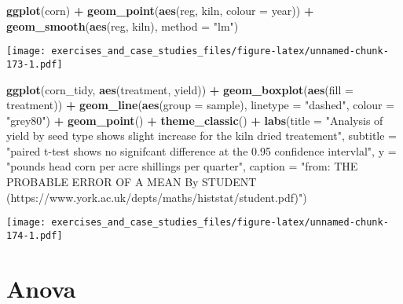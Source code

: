 \documentclass[]{book}
\newenvironment{Shaded}{\begin{snugshade}}{\end{snugshade}}
\newcommand{\DataTypeTok}[1]{\textcolor[rgb]{0.13,0.29,0.53}{#1}}
\newcommand{\KeywordTok}[1]{\textcolor[rgb]{0.13,0.29,0.53}{\textbf{#1}}}
\newcommand{\NormalTok}[1]{#1}
\newcommand{\OperatorTok}[1]{\textcolor[rgb]{0.81,0.36,0.00}{\textbf{#1}}}
\newcommand{\StringTok}[1]{\textcolor[rgb]{0.31,0.60,0.02}{#1}}
\theoremstyle{definition}
\theoremstyle{definition}
\theoremstyle{definition}
\theoremstyle{remark}
\begin{document}
\begin{Shaded}
\begin{Highlighting}[]
\KeywordTok{ggplot}\NormalTok{(corn) }\OperatorTok{+}
\StringTok{  }\KeywordTok{geom_point}\NormalTok{(}\KeywordTok{aes}\NormalTok{(reg, kiln, }\DataTypeTok{colour =}\NormalTok{ year)) }\OperatorTok{+}
\StringTok{  }\KeywordTok{geom_smooth}\NormalTok{(}\KeywordTok{aes}\NormalTok{(reg, kiln), }\DataTypeTok{method =} \StringTok{"lm"}\NormalTok{)}
\end{Highlighting}
\end{Shaded}

\texttt{[image: exercises\_and\_case\_studies\_files/figure-latex/unnamed-chunk-173-1.pdf]}

\begin{Shaded}
\begin{Highlighting}[]
\KeywordTok{ggplot}\NormalTok{(corn_tidy, }\KeywordTok{aes}\NormalTok{(treatment, yield)) }\OperatorTok{+}
\StringTok{  }\KeywordTok{geom_boxplot}\NormalTok{(}\KeywordTok{aes}\NormalTok{(}\DataTypeTok{fill =}\NormalTok{ treatment)) }\OperatorTok{+}
\StringTok{  }\KeywordTok{geom_line}\NormalTok{(}\KeywordTok{aes}\NormalTok{(}\DataTypeTok{group =}\NormalTok{ sample), }\DataTypeTok{linetype =} \StringTok{"dashed"}\NormalTok{, }\DataTypeTok{colour =} \StringTok{"grey80"}\NormalTok{) }\OperatorTok{+}\StringTok{ }
\StringTok{  }\KeywordTok{geom_point}\NormalTok{() }\OperatorTok{+}\StringTok{ }
\StringTok{  }\KeywordTok{theme_classic}\NormalTok{() }\OperatorTok{+}
\StringTok{  }\KeywordTok{labs}\NormalTok{(}\DataTypeTok{title =} \StringTok{"Analysis of yield by seed type shows slight increase for the kiln dried treatement"}\NormalTok{,}
       \DataTypeTok{subtitle =} \StringTok{"paired t-test shows no signifcant difference at the 0.95 confidence intervlal"}\NormalTok{,}
       \DataTypeTok{y =} \StringTok{"pounds head corn per acre shillings per quarter"}\NormalTok{, }\DataTypeTok{caption =} \StringTok{"from: THE PROBABLE ERROR OF A MEAN}
\StringTok{By STUDENT (https://www.york.ac.uk/depts/maths/histstat/student.pdf)"}\NormalTok{)}
\end{Highlighting}
\end{Shaded}

\texttt{[image: exercises\_and\_case\_studies\_files/figure-latex/unnamed-chunk-174-1.pdf]}

\hypertarget{anova}{%
\section{Anova}\label{anova}}
\end{document}
